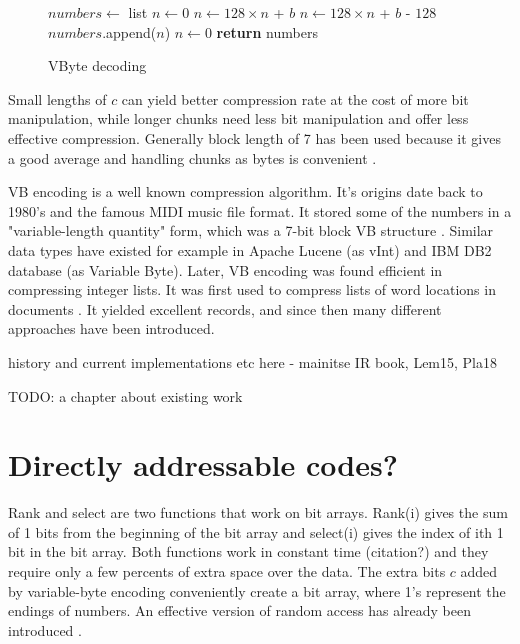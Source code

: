 \begin{figure}[ht]
\begin{algorithmic}
\State $numbers\gets $ list
\State $n\gets 0$
\State $n\gets 128\times n $ + $b$
\Else
\State $n\gets 128\times n $ + $b$ - $128$
\State $numbers$.append($n$)
\State $n\gets 0$
\EndIf
\EndFor
\State \textbf{return} numbers
\EndFunction
\end{algorithmic}
\caption{VByte decoding} \label{vbyte_dec}
\end{figure}

Small lengths of $c$ can yield better compression rate at the cost of more bit manipulation, while longer chunks need less bit manipulation and 
offer less effective compression. Generally block length of 7 has been used because it gives a good average and handling chunks as bytes is 
convenient \citep{Man08}.

VB encoding is a well known compression algorithm. It's origins date back to 1980's and the famous MIDI music file format. It stored some of the numbers
in a "variable-length quantity" form, which was a 7-bit block VB structure \citep{Mid96}. Similar data types have existed for example in Apache Lucene 
(as vInt) and IBM DB2 database (as Variable Byte). Later, VB encoding was found efficient in compressing integer lists. It was first used to compress
lists of word locations in documents \citep{Sch02}. It yielded excellent records, and since then many different approaches have been introduced. 



history and current implementations etc here
 - mainitse IR book, Lem15, Pla18

TODO: a chapter about existing work



\chapter{Directly addressable codes?}
Rank and select are two functions that work on bit arrays. Rank(i) gives the sum of 1 bits from the beginning of the bit array and select(i) gives
the index of ith 1 bit in the bit array. Both functions work in constant time (citation?) and they require only a few percents of extra space over
the data. The extra bits $c$ added by variable-byte encoding conveniently create a bit array, where 1's represent the endings of numbers. An effective
version of random access has already been introduced \citep{Bri09}. 

